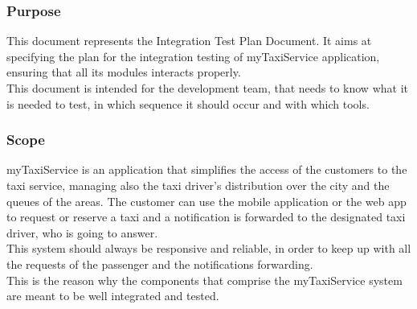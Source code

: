 \documentclass[18pt,oneside,a4paper, titlepage]{article}
\begin{document}
		\subsubsection{Purpose}
		This document represents the Integration Test Plan Document. It aims at specifying the plan for the integration testing of myTaxiService application, ensuring that all its modules interacts properly.\\
		This document is intended for the development team, that needs to know what it is needed to test, in which sequence it should occur and with which tools.
		\subsubsection{Scope}
		myTaxiService is an application that simplifies the access of the customers to the taxi service, managing also the taxi driver's distribution over the city and the queues of the areas. The customer can use the mobile application or the web app to request or reserve a taxi and a notification is forwarded to the designated taxi driver, who is going to answer.\\ This system should always be responsive and reliable, in order to keep up with all the requests of the passenger and the notifications forwarding.\\ This is the reason why the components that comprise the myTaxiService system are meant to be well integrated and tested.
\end{document}
